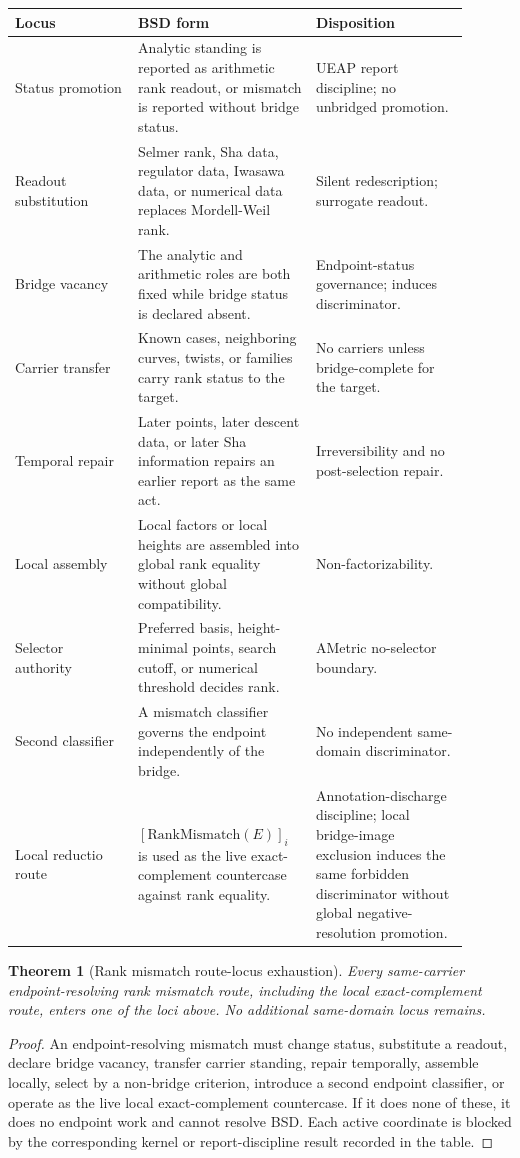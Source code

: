 \documentclass[11pt]{article}
\newtheorem{theorem}{Theorem}[section]
\newcommand{\RankMismatch}{\mathrm{RankMismatch}}
\begin{document}
\begin{longtable}{L{0.25\linewidth}L{0.34\linewidth}L{0.31\linewidth}}
\toprule
\textbf{Locus} & \textbf{BSD form} & \textbf{Disposition}\\
\midrule
Status promotion & Analytic standing is reported as arithmetic rank readout, or mismatch is reported without bridge status. & UEAP report discipline; no unbridged promotion.\\
Readout substitution & Selmer rank, Sha data, regulator data, Iwasawa data, or numerical data replaces Mordell-Weil rank. & Silent redescription; surrogate readout.\\
Bridge vacancy & The analytic and arithmetic roles are both fixed while bridge status is declared absent. & Endpoint-status governance; induces discriminator.\\
Carrier transfer & Known cases, neighboring curves, twists, or families carry rank status to the target. & No carriers unless bridge-complete for the target.\\
Temporal repair & Later points, later descent data, or later Sha information repairs an earlier report as the same act. & Irreversibility and no post-selection repair.\\
Local assembly & Local factors or local heights are assembled into global rank equality without global compatibility. & Non-factorizability.\\
Selector authority & Preferred basis, height-minimal points, search cutoff, or numerical threshold decides rank. & AMetric no-selector boundary.\\
Second classifier & A mismatch classifier governs the endpoint independently of the bridge. & No independent same-domain discriminator.\\
Local reductio route & $[\RankMismatch(E)]_i$ is used as the live exact-complement countercase against rank equality. & Annotation-discharge discipline; local bridge-image exclusion induces the same forbidden discriminator without global negative-resolution promotion.\\
\bottomrule
\end{longtable}

\begin{theorem}[Rank mismatch route-locus exhaustion]
Every same-carrier endpoint-resolving rank mismatch route, including the local exact-complement route, enters one of the loci above. No additional same-domain locus remains.
\end{theorem}

\begin{proof}
An endpoint-resolving mismatch must change status, substitute a readout, declare bridge vacancy, transfer carrier standing, repair temporally, assemble locally, select by a non-bridge criterion, introduce a second endpoint classifier, or operate as the live local exact-complement countercase. If it does none of these, it does no endpoint work and cannot resolve BSD. Each active coordinate is blocked by the corresponding kernel or report-discipline result recorded in the table.
\end{proof}
\end{document}
